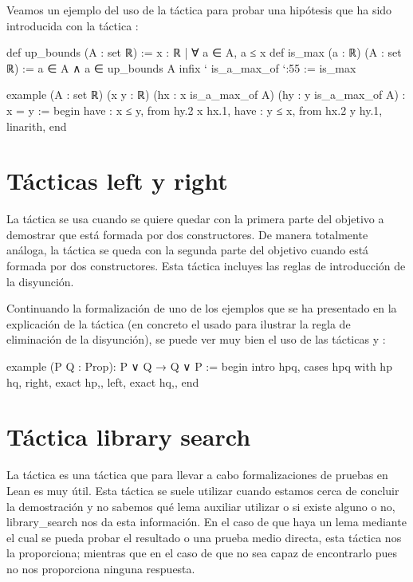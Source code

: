 Veamos un ejemplo del uso de la táctica  para probar una
hipótesis que ha sido introducida con la táctica :

\begin{leancode}
def up_bounds (A : set ℝ) := { x : ℝ | ∀ a ∈ A, a ≤ x}
def is_max (a : ℝ) (A : set ℝ) := a ∈ A ∧ a ∈ up_bounds A
infix ` is_a_max_of `:55 := is_max

example (A : set ℝ) (x y : ℝ) (hx : x is_a_max_of A) (hy : y is_a_max_of A) :
x = y :=
begin
  have : x ≤ y, from hy.2 x hx.1,
  have : y ≤ x, from hx.2 y hy.1,
  linarith,
end
\end{leancode}

\section{Tácticas left y right}

La táctica  se usa cuando se quiere quedar con la
primera parte del objetivo a demostrar que está formada por dos constructores.
De manera totalmente análoga, la táctica  se queda
con la segunda parte del objetivo cuando está formada por dos
constructores. Esta táctica incluyes las reglas de introducción de la
disyunción.

Continuando la formalización de uno de los ejemplos que se ha presentado en la
explicación de la táctica  (en concreto el usado para
ilustrar la regla de eliminación de la disyunción), se puede ver muy bien el
uso de las tácticas  y :
\begin{leancode}
example (P Q : Prop): P ∨ Q → Q ∨ P :=
begin
  intro hpq,
  cases hpq with hp hq,
  {right,
  exact hp,},
  {left,
  exact hq,},
end
\end{leancode}

\section{Táctica library search}

La táctica  es una táctica que
para llevar a cabo formalizaciones de pruebas en Lean es muy útil. Esta
táctica se suele utilizar cuando estamos cerca de concluir la
demostración y no sabemos qué lema auxiliar utilizar o si existe alguno
o no,  {library\_search} nos da esta
información. En el caso de que haya un lema mediante el cual se pueda
probar el resultado o una prueba medio directa, esta táctica nos la
proporciona; mientras que en el caso de que no sea capaz de encontrarlo
pues no nos proporciona ninguna respuesta.

